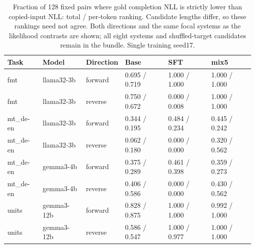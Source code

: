 \begin{table}[t]
\centering\small
\begin{tabular}{llllll}
\toprule
Task & Model & Direction & Base & SFT & mix5 \\
\midrule
fmt & llama32-3b & forward & 0.695 / 0.719 & 1.000 / 1.000 & 1.000 / 1.000 \\
fmt & llama32-3b & reverse & 0.750 / 0.672 & 0.000 / 0.008 & 1.000 / 1.000 \\
mt\_de-en & llama32-3b & forward & 0.344 / 0.195 & 0.484 / 0.234 & 0.445 / 0.242 \\
mt\_de-en & llama32-3b & reverse & 0.062 / 0.180 & 0.000 / 0.000 & 0.320 / 0.562 \\
mt\_de-en & gemma3-4b & forward & 0.375 / 0.289 & 0.461 / 0.398 & 0.359 / 0.273 \\
mt\_de-en & gemma3-4b & reverse & 0.406 / 0.586 & 0.000 / 0.000 & 0.430 / 0.562 \\
units & gemma3-12b & forward & 0.828 / 0.875 & 1.000 / 1.000 & 0.992 / 1.000 \\
units & gemma3-12b & reverse & 0.586 / 0.547 & 1.000 / 0.977 & 1.000 / 1.000 \\
\bottomrule
\end{tabular}
\caption{Fraction of 128 fixed pairs where gold completion NLL is strictly lower than copied-input NLL: total / per-token ranking. Candidate lengths differ, so these rankings need not agree. Both directions and the same focal systems as the likelihood contrasts are shown; all eight systems and shuffled-target candidates remain in the bundle. Single training seed17.}
\label{tab:sprint-candidates}
\end{table}
